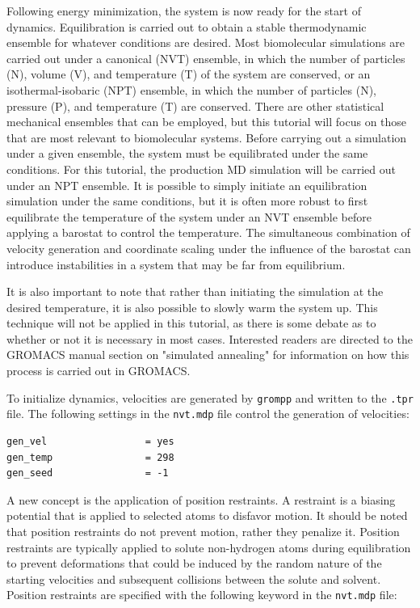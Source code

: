 \documentclass[9pt,tutorial,pubversion]{livecoms}
\begin{document}
Following energy minimization, the system is now ready for the start of dynamics. Equilibration is carried out to obtain a stable thermodynamic ensemble for whatever conditions are desired. Most biomolecular simulations are carried out under a canonical (NVT) ensemble, in which the number of particles (N), volume (V), and temperature (T) of the system are conserved, or an isothermal-isobaric (NPT) ensemble, in which the number of particles (N), pressure (P), and temperature (T) are conserved. There are other statistical mechanical ensembles that can be employed, but this tutorial will focus on those that are most relevant to biomolecular systems. Before carrying out a simulation under a given ensemble, the system must be equilibrated under the same conditions. For this tutorial, the production MD simulation will be carried out under an NPT ensemble. It is possible to simply initiate an equilibration simulation under the same conditions, but it is often more robust to first equilibrate the temperature of the system under an NVT ensemble before applying a barostat to control the temperature. The simultaneous combination of velocity generation and coordinate scaling under the influence of the barostat can introduce instabilities in a system that may be far from equilibrium.

It is also important to note that rather than initiating the simulation at the desired temperature, it is also possible to slowly warm the system up. This technique will not be applied in this tutorial, as there is some debate as to whether or not it is necessary in most cases. Interested readers are directed to the GROMACS manual section on "simulated annealing" for information on how this process is carried out in GROMACS.

To initialize dynamics, velocities are generated by \texttt{grompp} and written to the \texttt{.tpr} file. The following settings in the \texttt{nvt.mdp} file control the generation of velocities:

\begin{lstlisting}
gen_vel                 = yes
gen_temp                = 298
gen_seed                = -1
\end{lstlisting}

A new concept is the application of position restraints. A restraint is a biasing potential that is applied to selected atoms to disfavor motion. It should be noted that position restraints do not prevent motion, rather they penalize it. Position restraints are typically applied to solute non-hydrogen atoms during equilibration to prevent deformations that could be induced by the random nature of the starting velocities and subsequent collisions between the solute and solvent. Position restraints are specified with the following keyword in the \texttt{nvt.mdp} file:
\end{document}
